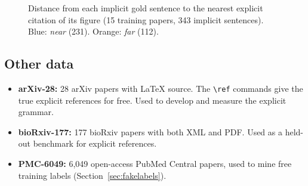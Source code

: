 \begin{figure}[h]
\centering
{}
\caption{Distance from each implicit gold sentence to the nearest explicit citation of its figure
(15 training papers, 343 implicit sentences). Blue: \emph{near} (231). Orange: \emph{far} (112).}
\label{fig:dist}
\end{figure}

\subsection{Other data}
\begin{itemize}
  \item \textbf{arXiv-28:} 28 arXiv papers with \LaTeX{} source. The \verb|\ref| commands give the true
        explicit references for free. Used to develop and measure the explicit grammar.
  \item \textbf{bioRxiv-177:} 177 bioRxiv papers with both XML and PDF. Used as a held-out benchmark for
        explicit references.
  \item \textbf{PMC-6049:} 6{,}049 open-access PubMed Central papers, used to mine free training labels
        (Section~\ref{sec:fakelabels}).
\end{itemize}
